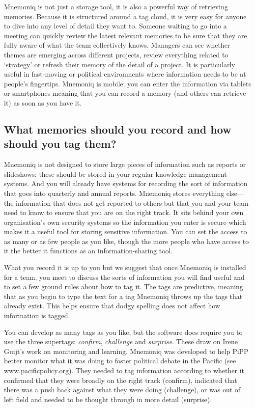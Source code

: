 \documentclass[letterpaper,10pt,english]{sphinxmanual}
\begin{document}
Mnemoniq is not just a storage tool, it is also a powerful way of
retrieving memories.  Because it is structured around a tag cloud, it
is very easy for anyone to dive into any level of detail they want to.
Someone waiting to go into a meeting can quickly review the latest
relevant memories to be sure that they are fully aware of what the
team collectively knows.  Managers can see whether themes are emerging
across different projects, review everything related to `strategy' or
refresh their memory of the detail of a project.  It is particularly
useful in fast-moving or political environments where information
needs to be at people's fingertips.  Mnemoniq is mobile; you can enter
the information via tablets or smartphones meaning that you can record
a memory (and others can retrieve it) as soon as you have it.


\subsection{What memories should you record and how should you tag them?}
\label{user-guide:what-memories-should-you-record-and-how-should-you-tag-them}
Mnemoniq is not designed to store large pieces of information such as
reports or slideshows: these should be stored in your regular
knowledge management systems.  And you will already have systems for
recording the sort of information that goes into quarterly and annual
reports.  Mnemoniq stores everything else—the information that does
not get reported to others but that you and your team need to know to
ensure that you are on the right track.  It sits behind your own
organisation's own security systems so the information you enter is
secure which makes it a useful tool for storing sensitive information.
You can set the access to as many or as few people as you like, though
the more people who have access to it the better it functions as an
information-sharing tool.

What you record it is up to you but we suggest that once Mnemoniq is
installed for a team, you meet to discuss the sorts of information you
will find useful and to set a few ground rules about how to tag
it. The tags are predictive, meaning that as you begin to type the
text for a tag Mnemoniq throws up the tags that already exist.  This
helps ensure that dodgy spelling does not affect how information is
tagged.

You can develop as many tags as you like, but the software does
require you to use the three supertags: \emph{confirm}, \emph{challenge} and
\emph{surprise}.  These draw on Irene Guijt's work on monitoring and
learning.  Mnemoniq was developed to help PiPP better monitor what it
was doing to foster political debate in the Pacific (see
www.pacificpolicy.org).  They needed to tag information according to
whether it confirmed that they were broadly on the right track
(confirm), indicated that there was a push back against what they were
doing (challenge), or was out of left field and needed to be thought
through in more detail (surprise).
\end{document}
